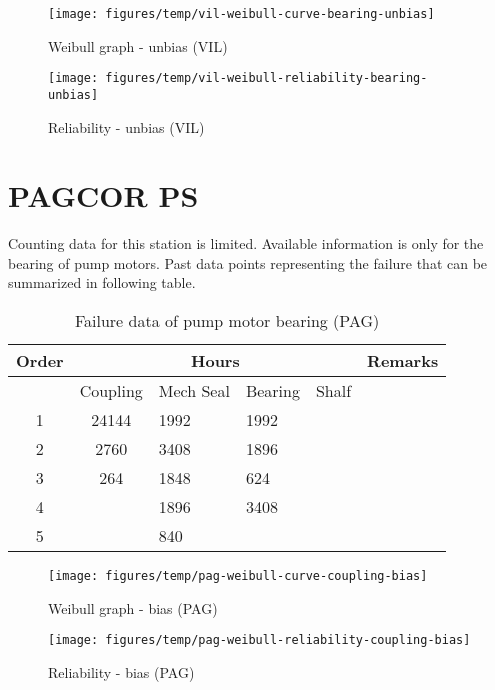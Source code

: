 \documentclass[fleqn]{article}
\begin{document}
\begin{figure}[!htb]
	\begin{minipage}[b]{0.5\linewidth}
		\centering
		\texttt{[image: figures/temp/vil-weibull-curve-bearing-unbias]}
		\caption{Weibull graph - unbias (VIL)}
		\label{vil-weibull-graph-vil-bearing-unbias}
	\end{minipage}
	\hspace{0.05cm}
	\begin{minipage}[b]{0.5\linewidth}
		\centering
		\texttt{[image: figures/temp/vil-weibull-reliability-bearing-unbias]}
		\caption{Reliability - unbias (VIL)}
		\label{vil-weibull-graph-vil-reliability-unbias}
	\end{minipage}
\end{figure}

\section{PAGCOR PS}


Counting data for this station is limited. Available information is only for the bearing of pump motors. Past data points representing the failure that can be summarized in following table.


\begin{table}[!htb]
	\centering
	\caption{Failure data of pump motor bearing (PAG)}
	\label{table_bearing_failure_bias}
	{\scriptsize
	\begin{tabular}{c|c|l|l|l|c}
		\hline
		Order & \multicolumn{4}{c|}{Hours} & Remarks \\ 
		\hline
		& Coupling & Mech Seal & Bearing & Shalf &  \\ 
		\hline
		1 & 24144 & 1992 & 1992 &  &  \\ 
		2 & 2760 & 3408 & 1896 &  &  \\ 
		3 & 264 & 1848 & 624 &  &  \\ 
		4 &  & 1896 & 3408 &  &  \\ 
		5 &  & 840 &  &  &  \\ 
		\hline
	\end{tabular}
	
		
	}%
\end{table}


\begin{figure}[!htb]
	\begin{minipage}[b]{0.5\linewidth}
		\centering
		\texttt{[image: figures/temp/pag-weibull-curve-coupling-bias]}
		\caption{Weibull graph - bias (PAG)}
		\label{vil-weibull-graph-vil-bearing-unbias}
	\end{minipage}
	\hspace{0.05cm}
	\begin{minipage}[b]{0.5\linewidth}
		\centering
		\texttt{[image: figures/temp/pag-weibull-reliability-coupling-bias]}
		\caption{Reliability - bias (PAG)}
		\label{vil-weibull-graph-vil-reliability-unbias}
	\end{minipage}
\end{figure}
\end{document}

